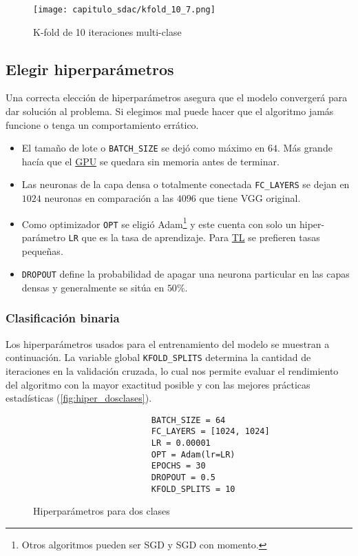 \begin{figure}[H]
    \centering
    \texttt{[image: capitulo\_sdac/kfold\_10\_7.png]}
    \caption{K-fold de 10 iteraciones multi-clase}\label{fig:kfold_7}
\end{figure}

\subsection{Elegir hiperparámetros}

Una correcta elección de hiperparámetros asegura que el modelo convergerá para
dar solución al problema. Si elegimos mal puede hacer que el algoritmo jamás
funcione o tenga un comportamiento errático. 

\begin{itemize}
    \item El tamaño de lote o \texttt{BATCH_SIZE} se dejó como máximo
    en \(64\). Más grande hacía que el \hyperlink{abbr}{GPU} se quedara sin
    memoria antes de terminar.
    \item Las neuronas de la capa densa o totalmente conectada
    \texttt{FC_LAYERS} se dejan en \(1024\) neuronas en comparación a
    las \(4096\) que tiene VGG original.
    \item Como optimizador \texttt{OPT} se eligió Adam\footnote{Otros
    algoritmos pueden ser SGD y SGD con momento.} y este cuenta con solo un
    hiper-parámetro \texttt{LR} que es la tasa de aprendizaje. Para
    \hyperlink{abbr}{TL} se prefieren tasas pequeñas.
    \item \texttt{DROPOUT} define la probabilidad de apagar una
    neurona particular en las capas densas y generalmente se sitúa en \(50\%\).
\end{itemize}

\subsubsection{Clasificación binaria}

Los hiperparámetros usados para el entrenamiento del modelo se muestran a
continuación. La variable global \texttt{KFOLD_SPLITS} determina la
cantidad de iteraciones en la validación cruzada, lo cual nos permite evaluar el
rendimiento del algoritmo con la mayor exactitud posible y con las mejores
prácticas estadísticas (\autoref{fig:hiper_dosclases}).

\begin{figure}[H]
    \centering
    \begin{verbatim}
                        BATCH_SIZE = 64
                        FC_LAYERS = [1024, 1024]
                        LR = 0.00001
                        OPT = Adam(lr=LR)
                        EPOCHS = 30
                        DROPOUT = 0.5
                        KFOLD_SPLITS = 10
    \end{verbatim}
     \caption{Hiperparámetros para dos clases}\label{fig:hiper_dosclases}
\end{figure}

